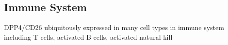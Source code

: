\subsection{Immune System}
DPP4/CD26 ubiquitously expressed in many cell types in immune system including T cells, activated B cells, activated natural kill